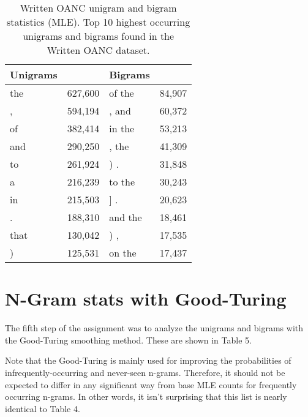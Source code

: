 \documentclass[11pt]{article}
\begin{document}
\begin{table}[h]
\begin{center}
\begin{tabular}{|lr|lr|}
\hline \bf Unigrams & & \bf Bigrams & \\ \hline
the & 627,600    & of the & 84,907 \\
, & 594,194      & , and & 60,372 \\
of & 382,414     & in the & 53,213 \\
and & 290,250    & , the & 41,309 \\
to & 261,924     & ) . & 31,848 \\
a & 216,239      & to the & 30,243 \\
in & 215,503     & ] . & 20,623 \\
. & 188,310      & and the & 18,461 \\
that & 130,042   & ) , & 17,535 \\
) & 125,531      & on the & 17,437 \\
\hline
\end{tabular}
\end{center}
\caption{\label{tokenStats} Written OANC unigram and bigram statistics (MLE).
Top 10 highest occurring unigrams and bigrams found in the Written OANC dataset.}
\end{table}

\section{N-Gram stats with Good-Turing}
The fifth step of the assignment was to analyze the unigrams and bigrams with the
Good-Turing smoothing method. These are shown in Table 5.

Note that the Good-Turing is mainly used for improving
the probabilities of infrequently-occurring and never-seen n-grams.  Therefore, it
should not be expected to differ in any significant way from base MLE counts for
frequently occurring n-grams.  In other words, it isn't surprising that this list
is nearly identical to Table 4.
\end{document}
